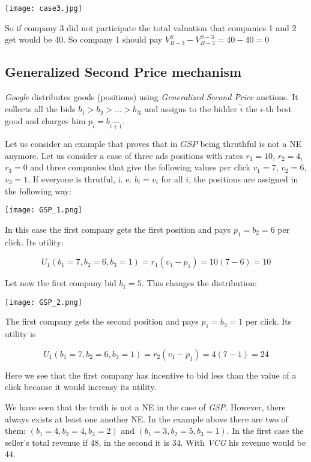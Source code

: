 \centerline{
\texttt{[image: case3.jpg]}}

So if company 3 did not participate the total valuation that companies 1 and 2 get would be 40. So company 1 should pay $V_{B-3}^{S}-V_{B-3}^{S-3}=40-40=0$

\subsection{Generalized Second Price mechanism}\label{subsec:GSP}

\textit{Google} distributes goods (positions) using \textit{Generalized Second Price} auctions. It collects all the bids $b_{\hat1} > b_{\hat2} > ... > b_{\hat N}$ and assigns to the bidder $\hat i$ the $i$-th best good and charges him $p_{\hat{i}} = b_{\hat{i+1}}$.

Let us consider an example that proves that in $GSP$ being thruthful is not a NE anymore.	Let us consider a case of three ads positions with rates $r_1 = 10$, $r_2 = 4$, $r_3 = 0$ and three companies that give the following values per click $v_1 = 7$, $v_2 = 6$, $v_3 = 1$. If everyone is thrutful, i. e. $b_i = v_i$ for all $i$, the positions are assigned in the following way:

\centerline{
\texttt{[image: GSP\_1.png]}}

In this case the first company gets the first position and pays $p_1 = b_2 = 6$ per click. Its utility:

\begin{equation}
U_1(b_1 = 7, b_2 = 6, b_3 = 1) = r_1 (v_1 - p_1) = 10(7-6) = 10
\end{equation}

Let now the first company bid $b_1 = 5$. This changes the distribution:

\centerline{
\texttt{[image: GSP\_2.png]}}

The first company gets the second position and pays $p_1 = b_3 = 1$ per click. Its utility is

\begin{equation}
U_1(b_1 = 7, b_2 = 6, b_3 = 1) = r_2 (v_1 - p_1) = 4(7-1) = 24
\end{equation}

Here we see that the first company has incentive to bid less than the value of a click because it would increasy its utility. 

We have seen that the truth is not a NE in the case of \textit{GSP}. However, there always exists at least one another NE. In the example above there are two of them: $(b_1 = 4, b_2 = 4, b_3 = 2)$ and $(b_1 = 3, b_2 = 5, b_3 = 1)$. In the first case the seller's total revenue if 48, in the second it is 34. With \textit{VCG} his revenue would be 44.


